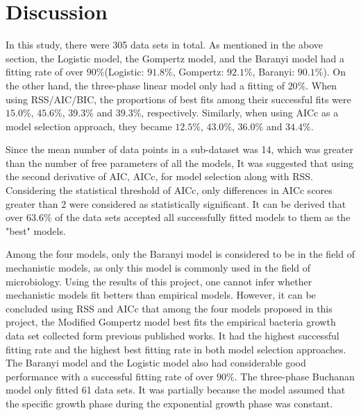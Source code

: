 

\section{Discussion}
 In this study, there were 305 data sets in total. As mentioned in the above section, the Logistic model, the Gompertz model, and the Baranyi model had a fitting rate of over $90\%$(Logistic: $91.8\%$, Gompertz: $92.1\%$, Baranyi: $90.1\%$). On the other hand, the three-phase linear model only had a fitting of $20\%$. When using RSS/AIC/BIC, the proportions of best fits among their successful fits were $15.0\%$, $45.6\%$, $39.3\%$ and $39.3\%$, respectively. Similarly, when using AICc as a model selection approach, they became $12.5\%$, $43.0\%$, $36.0\%$ and $34.4\%$.
 
 Since the mean number of data points in a sub-dataset was 14, which was greater than the number of free parameters of all the models, It was suggested that using the second derivative of AIC, AICc, for model selection along with RSS\citep{JOHNSON2004101}. Considering the statistical threshold of AICc, only differences in AICc scores greater than 2 were considered as statistically significant. It can be derived that over $63.6\%$ of the data sets accepted all successfully fitted models to them as the "best" models.
 
 Among the four models, only the Baranyi model is considered to be in the field of mechanistic models, as only this model is commonly used in the field of microbiology. Using the results of this project, one cannot infer whether mechanistic models fit betters than empirical models. However, it can be concluded using RSS and AICc that among the four models proposed in this project, the Modified Gompertz model best fits the empirical bacteria growth data set collected form previous published works. It had the highest successful fitting rate and the highest best fitting rate in both model selection approaches. The Baranyi model and the Logistic model also had considerable good performance with a successful fitting rate of over $90\%$. The three-phase Buchanan model only fitted 61 data sets. It was partially because the model assumed that the specific growth phase during the exponential growth phase was constant\citep{Buchanan1997}.
 
 
